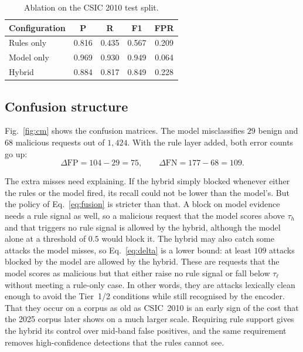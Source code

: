 \documentclass[preprint,11pt]{elsarticle}
\let\footnotesize\normalsize
\begin{document}
\begin{table}[t]
\centering
\footnotesize
\caption{Ablation on the CSIC 2010 test split.}
\label{tab:ablation}
\begin{tabular}{@{}lcccc@{}}
\toprule
Configuration & P & R & F1 & FPR \\
\midrule
Rules only  & 0.816 & 0.435 & 0.567 & 0.209 \\
Model only  & 0.969 & 0.930 & 0.949 & 0.064 \\
Hybrid      & 0.884 & 0.817 & 0.849 & 0.228 \\
\bottomrule
\end{tabular}
\end{table}

\subsection{Confusion structure}
Fig.~\ref{fig:cm} shows the confusion matrices. The model misclassifies
$29$ benign and $68$ malicious requests out of $1{,}424$. With the rule
layer added, both error counts go up:
\begin{equation}
\Delta\mathrm{FP}=104-29=75,\qquad \Delta\mathrm{FN}=177-68=109.
\label{eq:delta}
\end{equation} 

The extra misses need explaining. If the hybrid simply blocked whenever
either the rules or the model fired, its recall could not be lower than the
model's. But the policy of Eq.~\eqref{eq:fusion} is stricter than that. A
block on model evidence needs a rule signal as well, so a malicious request
that the model scores above $\tau_h$ and that triggers no rule signal is
allowed by the hybrid, although the model alone at a threshold of $0.5$
would block it. The hybrid may also catch some attacks the model misses, so
Eq.~\eqref{eq:delta} is a lower bound: at least $109$ attacks blocked by
the model are allowed by the hybrid. These are requests that the model
scores as malicious but that either raise no rule signal or fall below
$\tau_\ell$ without meeting a rule-only case. In other words, they are
attacks lexically clean enough to avoid the Tier~1/2 conditions while still
recognised by the encoder. That they occur on a corpus as old as CSIC~2010
is an early sign of the cost that the 2025 corpus later shows on a much
larger scale. Requiring rule support gives the hybrid its control over
mid-band false positives, and the same requirement removes high-confidence
detections that the rules cannot see.
\end{document}
